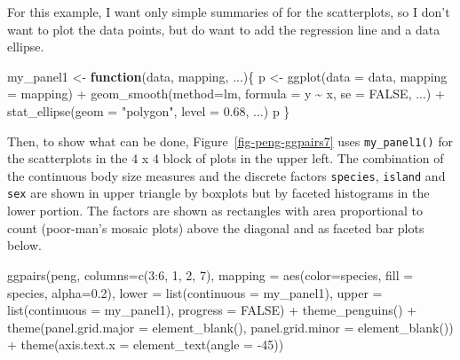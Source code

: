 \documentclass[
  letterpaper,
  10pt,
  krantz2]{krantz}
\makeatletter
\newenvironment{Shaded}{\begin{snugshade}}{\end{snugshade}}
\newcommand{\AttributeTok}[1]{\textcolor[rgb]{0.40,0.45,0.13}{#1}}
\newcommand{\ConstantTok}[1]{\textcolor[rgb]{0.56,0.35,0.01}{#1}}
\newcommand{\ControlFlowTok}[1]{\textcolor[rgb]{0.00,0.23,0.31}{\textbf{#1}}}
\newcommand{\DecValTok}[1]{\textcolor[rgb]{0.68,0.00,0.00}{#1}}
\newcommand{\FloatTok}[1]{\textcolor[rgb]{0.68,0.00,0.00}{#1}}
\newcommand{\FunctionTok}[1]{\textcolor[rgb]{0.28,0.35,0.67}{#1}}
\newcommand{\NormalTok}[1]{\textcolor[rgb]{0.00,0.23,0.31}{#1}}
\newcommand{\OtherTok}[1]{\textcolor[rgb]{0.00,0.23,0.31}{#1}}
\newcommand{\SpecialCharTok}[1]{\textcolor[rgb]{0.37,0.37,0.37}{#1}}
\newcommand{\StringTok}[1]{\textcolor[rgb]{0.13,0.47,0.30}{#1}}
\newenvironment{kframe}{%
  \medskip{}
  \setlength{\fboxsep}{.8em}
  \def\at@end@of@kframe{}%
  \ifinner\ifhmode%
  \def\at@end@of@kframe{\end{minipage}}%
  \begin{minipage}{\columnwidth}%
  \fi\fi%
  \def\FrameCommand##1{\hskip\@totalleftmargin \hskip-\fboxsep
  \colorbox{shadecolor}{##1}\hskip-\fboxsep
      \hskip-\linewidth \hskip-\@totalleftmargin \hskip\columnwidth}%
  \MakeFramed {\advance\hsize-\width
    \@totalleftmargin\z@ \linewidth\hsize
    \@setminipage}}%
{\par\unskip\endMakeFramed%
  \at@end@of@kframe}
\renewenvironment{Shaded}{\begin{kframe}}{\end{kframe}}
\makeatother
\begin{document}
For this example, I want only simple summaries of for the scatterplots,
so I don't want to plot the data points, but do want to add the
regression line and a data ellipse.

\begin{Shaded}
\begin{Highlighting}[]
\NormalTok{my\_panel1 }\OtherTok{\textless{}{-}} \ControlFlowTok{function}\NormalTok{(data, mapping, ...)\{}
\NormalTok{  p }\OtherTok{\textless{}{-}} \FunctionTok{ggplot}\NormalTok{(}\AttributeTok{data =}\NormalTok{ data, }\AttributeTok{mapping =}\NormalTok{ mapping) }\SpecialCharTok{+} 
     \FunctionTok{geom\_smooth}\NormalTok{(}\AttributeTok{method=}\NormalTok{lm, }\AttributeTok{formula =}\NormalTok{ y }\SpecialCharTok{\textasciitilde{}}\NormalTok{ x, }\AttributeTok{se =} \ConstantTok{FALSE}\NormalTok{, ...) }\SpecialCharTok{+}
     \FunctionTok{stat\_ellipse}\NormalTok{(}\AttributeTok{geom =} \StringTok{"polygon"}\NormalTok{, }\AttributeTok{level =} \FloatTok{0.68}\NormalTok{, ...)}
\NormalTok{  p}
\NormalTok{\}}
\end{Highlighting}
\end{Shaded}

Then, to show what can be done, Figure~\ref{fig-peng-ggpairs7} uses
\texttt{my\_panel1()} for the scatterplots in the 4 x 4 block of plots
in the upper left. The combination of the continuous body size measures
and the discrete factors \texttt{species}, \texttt{island} and
\texttt{sex} are shown in upper triangle by boxplots but by faceted
histograms in the lower portion. The factors are shown as rectangles
with area proportional to count (poor-man's mosaic plots) above the
diagonal and as faceted bar plots below.

\begin{Shaded}
\begin{Highlighting}[]
\FunctionTok{ggpairs}\NormalTok{(peng, }\AttributeTok{columns=}\FunctionTok{c}\NormalTok{(}\DecValTok{3}\SpecialCharTok{:}\DecValTok{6}\NormalTok{, }\DecValTok{1}\NormalTok{, }\DecValTok{2}\NormalTok{, }\DecValTok{7}\NormalTok{),}
        \AttributeTok{mapping =} \FunctionTok{aes}\NormalTok{(}\AttributeTok{color=}\NormalTok{species, }\AttributeTok{fill =}\NormalTok{ species, }\AttributeTok{alpha=}\FloatTok{0.2}\NormalTok{),}
        \AttributeTok{lower =} \FunctionTok{list}\NormalTok{(}\AttributeTok{continuous =}\NormalTok{ my\_panel1),}
        \AttributeTok{upper =} \FunctionTok{list}\NormalTok{(}\AttributeTok{continuous =}\NormalTok{ my\_panel1),}
        \AttributeTok{progress =} \ConstantTok{FALSE}\NormalTok{) }\SpecialCharTok{+}
  \FunctionTok{theme\_penguins}\NormalTok{() }\SpecialCharTok{+}
  \FunctionTok{theme}\NormalTok{(}\AttributeTok{panel.grid.major =} \FunctionTok{element\_blank}\NormalTok{(), }
        \AttributeTok{panel.grid.minor =} \FunctionTok{element\_blank}\NormalTok{()) }\SpecialCharTok{+} 
  \FunctionTok{theme}\NormalTok{(}\AttributeTok{axis.text.x =} \FunctionTok{element\_text}\NormalTok{(}\AttributeTok{angle =} \SpecialCharTok{{-}}\DecValTok{45}\NormalTok{))}
\end{Highlighting}
\end{Shaded}
\end{document}
